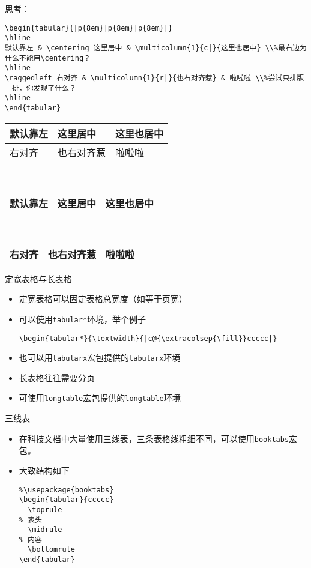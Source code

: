 \begin{frame}[fragile]
	思考：
\begin{lstlisting}
\begin{tabular}{|p{8em}|p{8em}|p{8em}|}
\hline
默认靠左 & \centering 这里居中 & \multicolumn{1}{c|}{这里也居中} \\%最右边为什么不能用\centering？
\hline
\raggedleft 右对齐 & \multicolumn{1}{r|}{也右对齐惹} & 啦啦啦 \\%尝试只排版一排，你发现了什么？
\hline
\end{tabular}
\end{lstlisting}
	\begin{tabular}{|p{8em}|p{8em}|p{8em}|}
		\hline
		默认靠左 & \centering 这里居中 & \multicolumn{1}{c|}{这里也居中} \\
		\hline
		\raggedleft 右对齐 & \multicolumn{1}{r|}{也右对齐惹} & 啦啦啦 \\
		\hline
	\end{tabular} \\[1ex]
	\begin{tabular}{|p{8em}|p{8em}|p{8em}|}
		\hline
		默认靠左 & \centering 这里居中 & \multicolumn{1}{c|}{这里也居中} \\
		\hline
	\end{tabular} \\[1ex]
	\begin{tabular}{|p{8em}|p{8em}|p{8em}|}
		\hline
		\raggedleft 右对齐 & \multicolumn{1}{r|}{也右对齐惹} & 啦啦啦 \\
		\hline
	\end{tabular}
\end{frame}
\begin{frame}[fragile]{定宽表格与长表格}
	\begin{itemize}
		\item 定宽表格可以固定表格总宽度（如等于页宽）
		\item 可以使用\texttt{tabular*}环境，举个例子\\
\begin{lstlisting}
\begin{tabular*}{\textwidth}{|c@{\extracolsep{\fill}}ccccc|}
\end{lstlisting}
		\item 也可以用\texttt{tabularx}宏包提供的\texttt{tabularx}环境
		\item 长表格往往需要分页
		\item 可使用\texttt{longtable}宏包提供的\texttt{longtable}环境
	\end{itemize}
\end{frame}
\begin{frame}[fragile]{三线表}
	\begin{itemize}
		\item 在科技文档中大量使用三线表，三条表格线粗细不同，可以使用\texttt{booktabs}宏包。
		\item 大致结构如下
\begin{lstlisting}
%\usepackage{booktabs}
\begin{tabular}{ccccc}
  \toprule
% 表头
  \midrule
% 内容
  \bottomrule
\end{tabular} 
\end{lstlisting}
	\end{itemize}
\end{frame}

